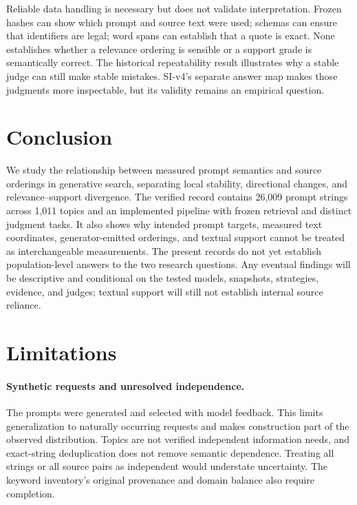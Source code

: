 Reliable data handling is necessary but does not validate interpretation. Frozen hashes can show which prompt and source text were used; schemas can ensure that identifiers are legal; word spans can establish that a quote is exact. None establishes whether a relevance ordering is sensible or a support grade is semantically correct. The historical repeatability result illustrates why a stable judge can still make stable mistakes. SI-v4's separate answer map makes those judgments more inspectable, but its validity remains an empirical question.

\section{Conclusion}
We study the relationship between measured prompt semantics and source orderings in generative search, separating local stability, directional changes, and relevance--support divergence. The verified record contains 26,009 prompt strings across 1,011 topics and an implemented pipeline with frozen retrieval and distinct judgment tasks. It also shows why intended prompt targets, measured text coordinates, generator-emitted orderings, and textual support cannot be treated as interchangeable measurements.  The present records do not yet establish population-level answers to the two research questions. Any eventual findings will be descriptive and conditional on the tested models, snapshots, strategies, evidence, and judges; textual support will still not establish internal source reliance.

\section*{Limitations}
\paragraph{Synthetic requests and unresolved independence.}
The prompts were generated and selected with model feedback. This limits generalization to naturally occurring requests and makes construction part of the observed distribution. Topics are not verified independent information needs, and exact-string deduplication does not remove semantic dependence. Treating all strings or all source pairs as independent would understate uncertainty. The keyword inventory's original provenance and domain balance also require completion.

